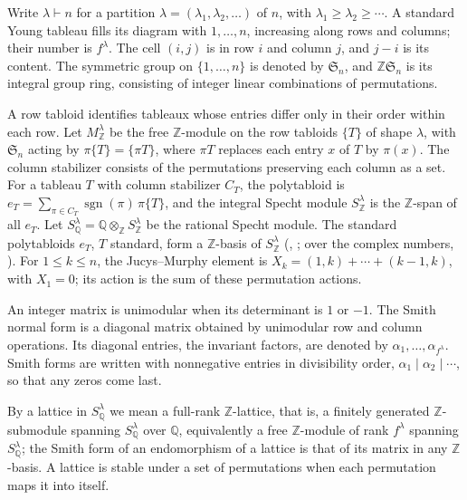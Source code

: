 \documentclass[11pt]{article}
\theoremstyle{remark}
\newcommand{\Z}{\mathbb{Z}}
\newcommand{\Q}{\mathbb{Q}}
\newcommand{\sn}{\mathfrak{S}_n}
\begin{document}
Write $\lambda\vdash n$ for a partition $\lambda=(\lambda_1,\lambda_2,\dots)$ of $n$, with $\lambda_1\ge\lambda_2\ge\cdots$. A standard Young tableau fills its diagram with $1,\dots,n$, increasing along rows and columns; their number is $f^\lambda$. The cell $(i,j)$ is in row $i$ and column $j$, and $j-i$ is its content. The symmetric group on $\{1,\dots,n\}$ is denoted by $\mathfrak S_n$, and $\Z\sn$ is its integral group ring, consisting of integer linear combinations of permutations.

A row tabloid identifies tableaux whose entries differ only in their order within each row. Let $M^\lambda_\Z$ be the free
$\Z$-module on the row tabloids $\{T\}$ of shape $\lambda$, with $\sn$
acting by $\pi\{T\}=\{\pi T\}$, where $\pi T$ replaces each entry $x$ of $T$
by $\pi(x)$. The column stabilizer consists of the permutations preserving each column as a set. For a tableau $T$ with column stabilizer $C_T$, the polytabloid
is $e_T=\sum_{\pi\in C_T}\operatorname{sgn}(\pi)\,\pi\{T\}$, and the integral
Specht module $S^\lambda_\Z$ is the $\Z$-span of all $e_T$. Let
$S^\lambda_\Q=\Q\otimes_\Z S^\lambda_\Z$ be the rational Specht module. The standard
polytabloids $e_T$, $T$ standard, form a $\Z$-basis of $S^\lambda_\Z$
(\cite[Theorem~8.4 and Corollary~8.6]{james},
\cite[Theorem~5.9.1]{grinberg}; over the complex numbers,
\cite[Theorem~2.6.5(1)]{sagan}).
For $1\le k\le n$, the Jucys--Murphy element is $X_k=(1,k)+\cdots+(k-1,k)$, with $X_1=0$; its action is the sum of these permutation actions.

An integer matrix is unimodular when its determinant is $1$ or $-1$.
The Smith normal form is a diagonal matrix obtained by unimodular row and column operations. Its diagonal entries, the invariant factors, are denoted by $\alpha_1,\dots,\alpha_{f^\lambda}$.
Smith forms are written with nonnegative entries in divisibility order, $\alpha_1\mid\alpha_2\mid\cdots$, so that any zeros come last.

By a lattice in $S^\lambda_\Q$ we mean a full-rank $\Z$-lattice, that is, a
finitely generated $\Z$-submodule spanning $S^\lambda_\Q$ over $\Q$,
equivalently a free $\Z$-module of rank $f^\lambda$ spanning
$S^\lambda_\Q$; the Smith form of an endomorphism of a lattice is that of its
matrix in any $\Z$-basis.
A lattice is stable under a set of permutations when each permutation maps it into itself.
\end{document}
